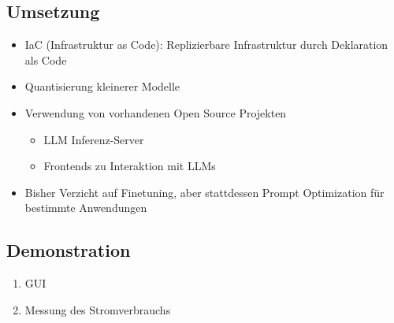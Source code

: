 \documentclass[
  letterpaper,
  DIV=11,
  numbers=noendperiod]{scrartcl}
\providecommand{\tightlist}{%
  \setlength{\itemsep}{0pt}\setlength{\parskip}{0pt}}\usepackage{longtable,booktabs,array}
\begin{document}
\subsection{Umsetzung}\label{umsetzung}

\begin{itemize}
\tightlist
\item
  IaC (Infrastruktur as Code): Replizierbare Infrastruktur durch
  Deklaration als Code
\item
  Quantisierung kleinerer Modelle
\item
  Verwendung von vorhandenen Open Source Projekten

  \begin{itemize}
  \tightlist
  \item
    LLM Inferenz-Server
  \item
    Frontends zu Interaktion mit LLMs
  \end{itemize}
\item
  Bisher Verzicht auf Finetuning, aber stattdessen Prompt Optimization
  für bestimmte Anwendungen
\end{itemize}

\subsection{Demonstration}\label{demonstration}

\begin{enumerate}
\def\labelenumi{\arabic{enumi}.}
\tightlist
\item
  GUI
\item
  Messung des Stromverbrauchs
\end{enumerate}
\end{document}
